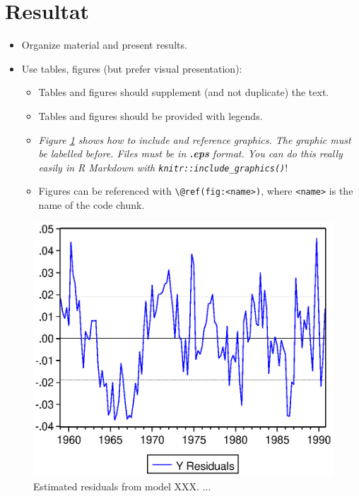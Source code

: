 \documentclass[a4paper,11pt]{article}
\begin{document}
\hypertarget{sec:resultat}{%
\section{Resultat}\label{sec:resultat}}
\begin{itemize}
\item
  Organize material and present results.
\item
  Use tables, figures (but prefer visual presentation):
  \begin{itemize}
  \item
    Tables and figures should supplement (and not duplicate) the text.
  \item
    Tables and figures should be provided with legends.
  \item
    \emph{Figure \ref{fig:graph} shows how to include and reference graphics.
    The graphic must be labelled before. Files must be in \textbf{.eps} format. You
    can do this really easily in R Markdown with \texttt{knitr::include\_graphics()}}!
  \item
    Figures can be referenced with \texttt{\textbackslash{}@ref(fig:\textless{}name\textgreater{})}, where \texttt{\textless{}name\textgreater{}} is the
    name of the code chunk.
  \end{itemize}
\end{itemize}
\begin{figure}

{\centering \includegraphics[width=0.5\linewidth]{figures/graph} 

}

\caption{Estimated residuals from model XXX. ...}\label{fig:graph}
\end{figure}
\end{document}
